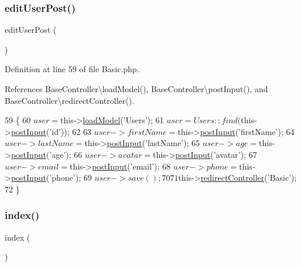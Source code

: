 \subsubsection{\texorpdfstring{edit\+User\+Post()}{editUserPost()}}
{\footnotesize\ttfamily edit\+User\+Post (\begin{DoxyParamCaption}{ }\end{DoxyParamCaption})}



Definition at line 59 of file Basic.\+php.



References Base\+Controller\textbackslash{}load\+Model(), Base\+Controller\textbackslash{}post\+Input(), and Base\+Controller\textbackslash{}redirect\+Controller().


\begin{DoxyCode}
59                                    \{
60         $user = $this->\hyperlink{class_base_controller_a5fa8890bd3a9d20f5c0cc2377dc49eb1}{loadModel}(\textcolor{stringliteral}{'Users'});
61         $user = Users::find($this->\hyperlink{class_base_controller_a170629218b28c1759a89c4978b9323b3}{postInput}(\textcolor{stringliteral}{'id'}));
62 
63         $user->firstName = $this->\hyperlink{class_base_controller_a170629218b28c1759a89c4978b9323b3}{postInput}(\textcolor{stringliteral}{'firstName'});
64         $user->lastName = $this->\hyperlink{class_base_controller_a170629218b28c1759a89c4978b9323b3}{postInput}(\textcolor{stringliteral}{'lastName'});
65         $user->age = $this->\hyperlink{class_base_controller_a170629218b28c1759a89c4978b9323b3}{postInput}(\textcolor{stringliteral}{'age'});
66         $user->avatar = $this->\hyperlink{class_base_controller_a170629218b28c1759a89c4978b9323b3}{postInput}(\textcolor{stringliteral}{'avatar'});
67         $user->email = $this->\hyperlink{class_base_controller_a170629218b28c1759a89c4978b9323b3}{postInput}(\textcolor{stringliteral}{'email'});
68         $user->phone = $this->\hyperlink{class_base_controller_a170629218b28c1759a89c4978b9323b3}{postInput}(\textcolor{stringliteral}{'phone'});
69         $user->save();
70 
71         $this->\hyperlink{class_base_controller_a85ddb683efc64655be063b697f631beb}{redirectController}(\textcolor{stringliteral}{'Basic'});
72     \}
\end{DoxyCode}
\hypertarget{class_basic_a149eb92716c1084a935e04a8d95f7347}{}\label{class_basic_a149eb92716c1084a935e04a8d95f7347} 
\subsubsection{\texorpdfstring{index()}{index()}}
{\footnotesize\ttfamily index (\begin{DoxyParamCaption}{ }\end{DoxyParamCaption})}



